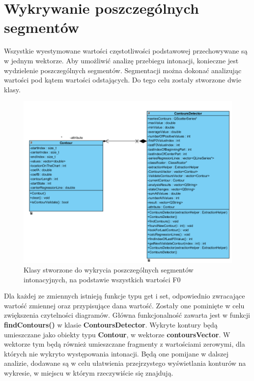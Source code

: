 \documentclass[a4paper,12 pt]{report}
\begin{document}
\section{Wykrywanie poszczególnych segmentów}
Wszystkie wyestymowane wartości częstotliwości podstawowej przechowywane są w jednym wektorze. Aby umożliwić analizę przebiegu intonacji, konieczne jest wydzielenie poszczególnych segmentów. Segmentacji można dokonać analizując wartości pod kątem wartości odstających.
 Do tego celu zostały stworzone dwie klasy.

\begin{figure}[h]
\centering
\includegraphics[scale=0.85]{contourDetector.png}
\caption{Klasy stworzone do wykrycia poszczególnych segmentów intonacyjnych, na podstawie wszystkich wartości F0}
\end{figure}

Dla każdej ze zmiennych istnieją funkcje typu get i set, odpowiednio zwracające wartość zmiennej oraz przypisujące dana wartość. Zostały one pominięte w celu zwiększenia czytelności diagramów.
Główna funkcjonalność zawarta jest w funkcji \textbf{findContours()} w klasie \textbf{ContoursDetector}. Wykryte kontury będą umieszczane jako obiekty typu \textbf{Contour}, w wektorze \textbf{contoursVector}. W wektorze tym będą również umieszczane fragmenty z wartościami zerowymi, dla których nie wykryto występowania intonacji. Będą one pomijane w dalszej analizie, dodawane są w celu ułatwienia przejrzystego wyświetlania konturów na wykresie, w miejscu w którym rzeczywiście się znajdują.
\end{document}
